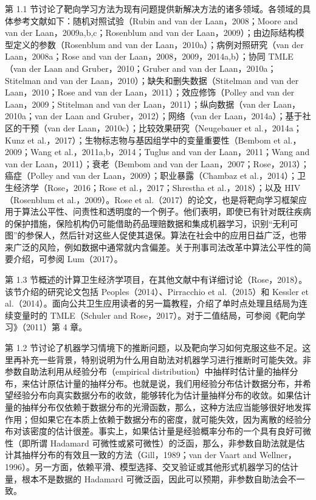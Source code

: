 第 1.1 节讨论了靶向学习方法为现有问题提供新解决方法的诸多领域。各领域的具体参考文献如下：随机对照试验（Rubin and van der Laan，2008；Moore and van der Laan，2009a,b,c；Rosenblum and van der Laan，2009）；由边际结构模型定义的参数（Rosenblum and van der Laan，2010a）；病例对照研究（van der Laan，2008a；Rose and van der Laan，2008，2009，2014a,b）；协同 TMLE（van der Laan and Gruber，2010；Gruber and van der Laan，2010a；Stitelman and van der Laan，2010）；缺失和删失数据（Stitelman and van der Laan，2010；Rose and van der Laan，2011）；效应修饰（Polley and van der Laan，2009；Stitelman and van der Laan，2011）；纵向数据（van der Laan，2010a；van der Laan and Gruber，2012）；网络（van der Laan，2014a）；基于社区的干预（van der Laan，2010c）；比较效果研究（Neugebauer et al.，2014a；Kunz et al.，2017）；生物标志物与基因组学中的变量重要性（Bembom et al.，2009；Wang et al.，2011a,b，2014；Tuglus and van der Laan，2011；Wang and van der Laan，2011）；衰老（Bembom and van der Laan，2007；Rose，2013）；癌症（Polley and van der Laan，2009）；职业暴露（Chambaz et al.，2014）；卫生经济学（Rose，2016；Rose et al.，2017；Shrestha et al.，2018）；以及 HIV（Rosenblum et al.，2009）。Rose et al.（2017）的论文，也是将靶向学习框架应用于算法公平性、问责性和透明度的一个例子。他们表明，即使已有针对既往疾病的保护措施，保险机构仍可能借助药品理赔数据和集成机器学习，识别“无利可图”的参保人，然后针对这些人促使其退保。算法在社会中的应用日益广泛，也带来广泛的风险，例如数据中通常就内含偏差。关于刑事司法改革中算法公平性的简要介绍，可参阅 Lum（2017）。

第 1.3 节概述的计算卫生经济学项目，在其他文献中有详细讨论（Rose，2018）。该节介绍的研究论文包括 Peoples（2014）、Pirracchio et al.（2015）和 Kessler et al.（2014）。面向公共卫生应用读者的另一篇教程，介绍了单时点处理且结局为连续变量时的 TMLE（Schuler and Rose，2017）。对于二值结局，可参阅《靶向学习》（2011）第 4 章。

第 1.2 节讨论了机器学习情境下的推断问题，以及靶向学习如何克服这些不足。这里再补充一些背景，特别说明为什么用自助法对机器学习进行推断时可能失效。非参数自助法利用从经验分布（empirical distribution）中抽样时估计量的抽样分布，来估计原估计量的抽样分布。也就是说，我们用经验分布估计数据分布，并希望经验分布向真实数据分布的收敛，能够转化为估计量抽样分布的收敛。如果估计量的抽样分布仅依赖于数据分布的光滑函数，那么，这种方法应当能够很好地发挥作用；但如果它在本质上依赖于数据分布的密度，就可能失效，因为离散的经验分布对该密度的估计很差。事实上，如果估计量是经验概率分布的一个具有良好可微性（即所谓 Hadamard 可微性或紧可微性）的泛函，那么，非参数自助法就是估计其抽样分布的有效且一致的方法（Gill，1989；van der Vaart and Wellner，1996）。另一方面，依赖平滑、模型选择、交叉验证或其他形式机器学习的估计量，根本不是数据的 Hadamard 可微泛函，因此可以预期，非参数自助法会不一致。
